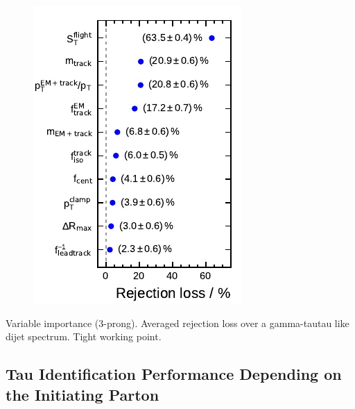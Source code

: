 \begin{minipage}{\textwidth}
\begin{subfigure}[t]{0.32\textwidth}
  \end{subfigure}
  \begin{subfigure}[t]{0.32\textwidth}
    \centering
    \includegraphics{./figures/bdt_perf/var_importance/3p_iter3.pdf}
  \end{subfigure}

  \caption{Variable importance (3-prong). Averaged rejection loss over a
    gamma-tautau like dijet spectrum. Tight working point.}
  \label{fig:variable_importance_3p_app}
\end{minipage}

\FloatBarrier
\subsection{Tau Identification Performance Depending on the Initiating Parton}
\label{app:bdt_parton}

